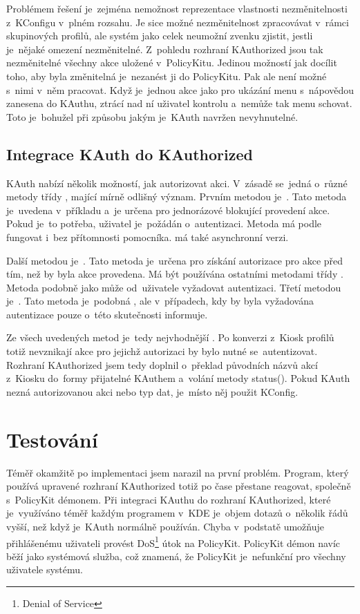 Problémem řešení je~zejména nemožnost reprezentace vlastnosti nezměnitelnosti z~KConfigu v~plném rozsahu. Je sice možné nezměnitelnost zpracovávat v~rámci skupinových profilů, ale systém jako celek neumožní zvenku zjistit, jestli je~nějaké omezení nezměnitelné. Z~pohledu rozhraní KAuthorized jsou tak nezměnitelné všechny akce uložené v~PolicyKitu. Jedinou možností jak docílit toho, aby byla změnitelná je~nezanést ji do PolicyKitu. Pak ale není možné s~nimi v~něm pracovat. Když je~jednou akce jako  pro ukázání menu s~nápovědou zanesena do KAuthu, ztrácí nad ní uživatel kontrolu a~nemůže tak menu schovat. Toto je~bohužel při způsobu jakým je~KAuth navržen nevyhnutelné.

\subsection*{Integrace KAuth do KAuthorized}
KAuth nabízí několik možností, jak autorizovat akci. V~zásadě se~jedná o~různé metody třídy , mající mírně odlišný význam. Prvním metodou je~. Tato metoda je~uvedena v~příkladu \cite{KAuthusage} a~je určena pro jednorázové blokující provedení akce. Pokud je~to potřeba, uživatel je~požádán o~autentizaci. Metoda má podle \cite{KAuthusage} fungovat i~bez přítomnosti pomocníka.  má také asynchronní verzi.

Další metodou je~. Tato metoda je~určena pro získání autorizace pro akce před tím, než by byla akce provedena. Má být používána ostatními metodami třídy . Metoda podobně jako  může od~uživatele vyžadovat autentizaci. Třetí metodou je~. Tato metoda je~podobná , ale v~případech, kdy by byla vyžadována autentizace pouze o~této skutečnosti informuje.

Ze všech uvedených metod je~tedy nejvhodnější . Po konverzi z~Kiosk profilů totiž nevznikají akce pro jejichž autorizaci by bylo nutné se~autentizovat. Rozhraní KAuthorized jsem tedy doplnil o~překlad původních názvů akcí z~Kiosku do~formy přijatelné KAuthem a~volání metody status(). Pokud KAuth nezná autorizovanou akci nebo typ dat, je~místo něj použit KConfig.

\section{Testování}
Téměř okamžitě po implementaci jsem narazil na první problém. Program, který používá upravené rozhraní KAuthorized totiž po čase přestane reagovat, společně s~PolicyKit démonem. Při integraci KAuthu do rozhraní KAuthorized, které je~využíváno téměř každým programem v~KDE je~objem dotazů o~několik řádů vyšší, než když je~KAuth normálně používán. Chyba v~podstatě umožňuje přihlášenému uživateli provést DoS\footnote{Denial of Service} útok na PolicyKit. PolicyKit démon navíc běží jako systémová služba, což znamená, že PolicyKit je~nefunkční pro všechny uživatele systému.

